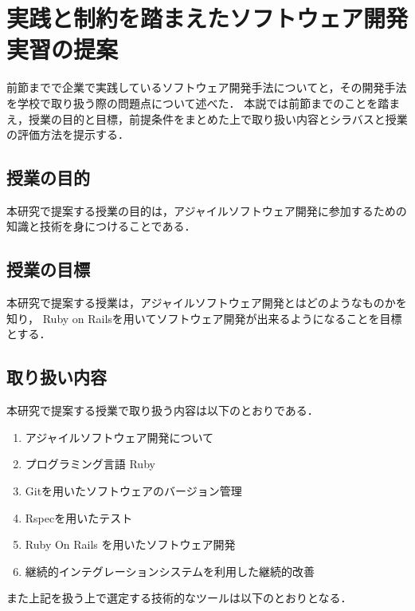 \section{実践と制約を踏まえたソフトウェア開発実習の提案}

前節までで企業で実践しているソフトウェア開発手法についてと，その開発手法を学校で取り扱う際の問題点について述べた．
本説では前節までのことを踏まえ，授業の目的と目標，前提条件をまとめた上で取り扱い内容とシラバスと授業の評価方法を提示する．

\subsection{授業の目的}

本研究で提案する授業の目的は，アジャイルソフトウェア開発に参加するための知識と技術を身につけることである．

\subsection{授業の目標}

本研究で提案する授業は，アジャイルソフトウェア開発とはどのようなものかを知り， Ruby on Railsを用いてソフトウェア開発が出来るようになることを目標とする．

\subsection{取り扱い内容}

本研究で提案する授業で取り扱う内容は以下のとおりである．

\begin{enumerate}
  \item アジャイルソフトウェア開発について
  \item プログラミング言語 Ruby
  \item Gitを用いたソフトウェアのバージョン管理
  \item Rspecを用いたテスト
  \item Ruby On Rails を用いたソフトウェア開発
  \item 継続的インテグレーションシステムを利用した継続的改善
\end{enumerate}

また上記を扱う上で選定する技術的なツールは以下のとおりとなる．

